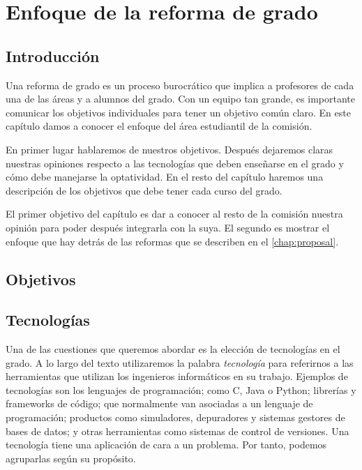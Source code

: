 \chapter{Enfoque de la reforma de grado}

\section{Introducción}


Una reforma de grado es un proceso burocrático que implica a
profesores de cada una de las áreas y a alumnos del grado.
Con un equipo tan grande,
es importante comunicar los objetivos individuales para
tener un objetivo común claro.
En este capítulo damos a conocer el enfoque del área estudiantil de la comisión.


En primer lugar hablaremos de nuestros objetivos.
Después dejaremos claras nuestras opiniones respecto a
las tecnologías que deben enseñarse en el grado y
cómo debe manejarse la optatividad.
En el resto del capítulo
haremos una descripción de los objetivos que debe tener cada curso del grado.


El primer objetivo del capítulo es
dar a conocer al resto de la comisión nuestra opinión
para poder después integrarla con la suya.
El segundo es mostrar el enfoque que
hay detrás de las reformas que se describen en el \cref{chap:proposal}.

\section{Objetivos}

\section{Tecnologías}

Una de las cuestiones que queremos abordar es
la elección de tecnologías en el grado.
A lo largo del texto utilizaremos la palabra \emph{tecnología} para referirnos a
las herramientas que utilizan los ingenieros informáticos en su trabajo.
Ejemplos de tecnologías son
los lenguajes de programación;
como C, Java o Python;
librerías y frameworks de código;
que normalmente van asociadas a un lenguaje de programación;
productos como simuladores, depuradores y sistemas gestores de bases de datos; y
otras herramientas como sistemas de control de versiones.
Una tecnología tiene una aplicación de cara a un problema.
Por tanto, podemos agruparlas según su propósito.

